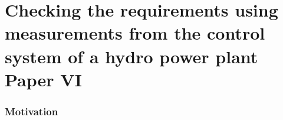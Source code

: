 \section{Checking the requirements using measurements from the control system of a hydro power plant Paper VI}
\begin{frame}
	\frametitle{Motivation}
\end{frame}
